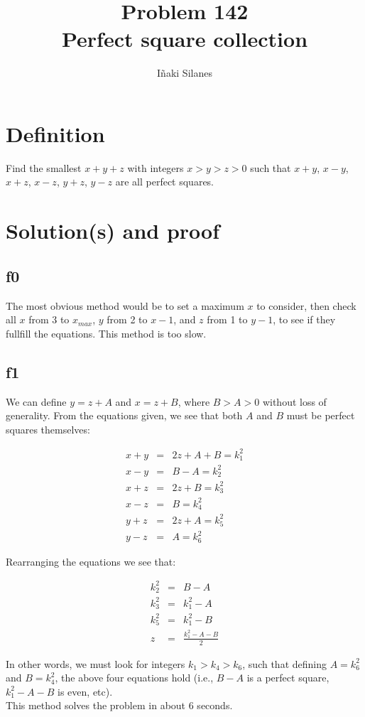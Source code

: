 \documentclass[english]{article}
\begin{document}
\newcommand{\mc}{\multicolumn}
\newcommand{\mr}{\multirow}
\newcommand{\cw}{\columnwidth}
\newcommand{\ig}[2]{\texttt{[image: \#2]}}

\title{Problem 142\\Perfect square collection}
\author{I\~naki Silanes}
\maketitle

\section{Definition}

Find the smallest $x + y + z$ with integers $x > y > z > 0$ such that $x + y$, $x - y$, $x + z$, $x - z$, $y + z$, $y - z$ are all perfect squares.

\section{Solution(s) and proof}

\subsection{f0}

The most obvious method would be to set a maximum $x$ to consider, then check all $x$ from 3 to $x_{max}$, $y$ from 2 to $x-1$, and $z$ from 1 to $y-1$, to see if they fullfill the equations. This method is too slow.

\subsection{f1}

We can define $y = z + A$ and $x = z + B$, where $B > A > 0$ without loss of generality. From the equations given, we see that both $A$ and $B$ must be perfect squares themselves:

\begin{eqnarray}
x+y &=& 2z + A + B = k_1^2 \\
x-y &=& B - A = k_2^2 \\
x+z &=& 2z + B = k_3^2 \\
x-z &=& B = k_4^2 \\
y+z &=& 2z + A = k_5^2 \\
y-z &=& A = k_6^2
\end{eqnarray}

Rearranging the equations we see that:

\begin{eqnarray}
k_2^2 &=& B - A \\
k_3^2 &=& k_1^2 - A \\
k_5^2 &=& k_1^2 - B \\
z &=& \frac{k_1^2 - A - B}{2}
\end{eqnarray}

In other words, we must look for integers $k_1 > k_4 > k_6$, such that defining $A = k_6^2$ and $B = k_4^2$, the above four equations hold (i.e., $B-A$ is a perfect square, $k_1^2 - A - B$ is even, etc).\\

This method solves the problem in about 6 seconds.
\end{document}
